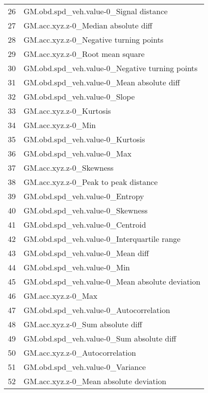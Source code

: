 \begin{tabular}{ll}
26 &            GM.obd.spd\_veh.value-0\_Signal distance \\
27 &               GM.acc.xyz.z-0\_Median absolute diff \\
28 &            GM.acc.xyz.z-0\_Negative turning points \\
29 &                   GM.acc.xyz.z-0\_Root mean square \\
30 &    GM.obd.spd\_veh.value-0\_Negative turning points \\
31 &         GM.obd.spd\_veh.value-0\_Mean absolute diff \\
32 &                      GM.obd.spd\_veh.value-0\_Slope \\
33 &                           GM.acc.xyz.z-0\_Kurtosis \\
34 &                                GM.acc.xyz.z-0\_Min \\
35 &                   GM.obd.spd\_veh.value-0\_Kurtosis \\
36 &                        GM.obd.spd\_veh.value-0\_Max \\
37 &                           GM.acc.xyz.z-0\_Skewness \\
38 &              GM.acc.xyz.z-0\_Peak to peak distance \\
39 &                    GM.obd.spd\_veh.value-0\_Entropy \\
40 &                   GM.obd.spd\_veh.value-0\_Skewness \\
41 &                   GM.obd.spd\_veh.value-0\_Centroid \\
42 &        GM.obd.spd\_veh.value-0\_Interquartile range \\
43 &                  GM.obd.spd\_veh.value-0\_Mean diff \\
44 &                        GM.obd.spd\_veh.value-0\_Min \\
45 &    GM.obd.spd\_veh.value-0\_Mean absolute deviation \\
46 &                                GM.acc.xyz.z-0\_Max \\
47 &            GM.obd.spd\_veh.value-0\_Autocorrelation \\
48 &                  GM.acc.xyz.z-0\_Sum absolute diff \\
49 &          GM.obd.spd\_veh.value-0\_Sum absolute diff \\
50 &                    GM.acc.xyz.z-0\_Autocorrelation \\
51 &                   GM.obd.spd\_veh.value-0\_Variance \\
52 &            GM.acc.xyz.z-0\_Mean absolute deviation \\

\end{tabular}
